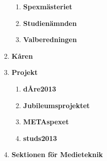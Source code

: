 \documentclass{dagordning}
\begin{document}
\begin{enumerate}
\begin{enumerate}
        \item \textbf{Spexmästeriet}
        \item \textbf{Studienämnden}
        \item \textbf{Valberedningen} 
      \end{enumerate}
    \item \textbf{Kåren}
    \item \textbf{Projekt}
      \begin{enumerate}
        \item \textbf{dÅre2013}
        \item \textbf{Jubileumsprojektet}
        \item \textbf{METAspexet}
        \item \textbf{studs2013}
      \end{enumerate}
    \item \textbf{Sektionen för Medieteknik}
  \end{enumerate}








\end{document}
